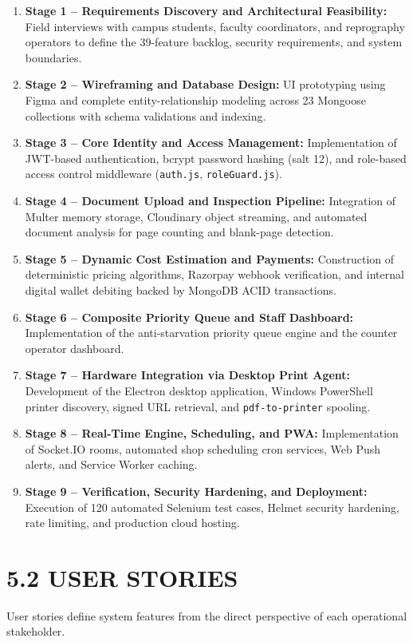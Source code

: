 \documentclass[12pt,a4paper,oneside]{report}
\begin{document}
\begin{enumerate}[leftmargin=0.35in, itemsep=3pt]
  \item \textbf{Stage 1 -- Requirements Discovery and Architectural Feasibility:} Field interviews with campus students, faculty coordinators, and reprography operators to define the 39-feature backlog, security requirements, and system boundaries.
  \item \textbf{Stage 2 -- Wireframing and Database Design:} UI prototyping using Figma and complete entity-relationship modeling across 23 Mongoose collections with schema validations and indexing.
  \item \textbf{Stage 3 -- Core Identity and Access Management:} Implementation of JWT-based authentication, bcrypt password hashing (salt 12), and role-based access control middleware (\texttt{auth.js}, \texttt{roleGuard.js}).
  \item \textbf{Stage 4 -- Document Upload and Inspection Pipeline:} Integration of Multer memory storage, Cloudinary object streaming, and automated document analysis for page counting and blank-page detection.
  \item \textbf{Stage 5 -- Dynamic Cost Estimation and Payments:} Construction of deterministic pricing algorithms, Razorpay webhook verification, and internal digital wallet debiting backed by MongoDB ACID transactions.
  \item \textbf{Stage 6 -- Composite Priority Queue and Staff Dashboard:} Implementation of the anti-starvation priority queue engine and the counter operator dashboard.
  \item \textbf{Stage 7 -- Hardware Integration via Desktop Print Agent:} Development of the Electron desktop application, Windows PowerShell printer discovery, signed URL retrieval, and \texttt{pdf-to-printer} spooling.
  \item \textbf{Stage 8 -- Real-Time Engine, Scheduling, and PWA:} Implementation of Socket.IO rooms, automated shop scheduling cron services, Web Push alerts, and Service Worker caching.
  \item \textbf{Stage 9 -- Verification, Security Hardening, and Deployment:} Execution of 120 automated Selenium test cases, Helmet security hardening, rate limiting, and production cloud hosting.
\end{enumerate}

\section{5.2 USER STORIES}
User stories define system features from the direct perspective of each operational stakeholder.
\end{document}
